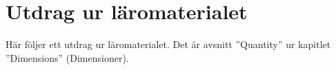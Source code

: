 \chapter{Utdrag ur läromaterialet}
\label{cha:utdrag}

Här följer ett utdrag ur läromaterialet. Det är avsnitt ''Quantity'' ur kapitlet ''Dimensions'' (Dimensioner).


